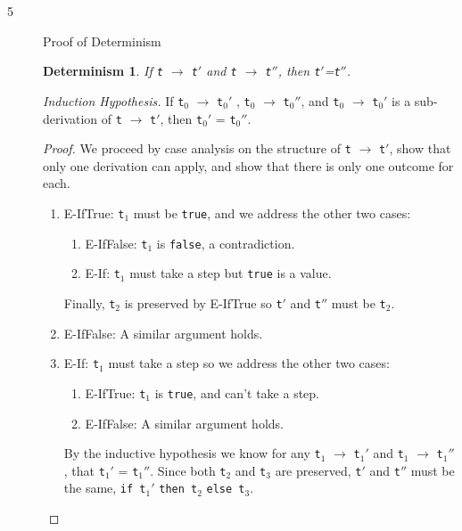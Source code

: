 \documentclass{article}
\newtheorem{deter}{Determinism}
\begin{document}
\begin{description}
\newpage

  \item[5]{Proof of Determinism}
    \begin{deter}If \verb|t| $\longrightarrow$ \verb|t|$'$ and \verb|t| $\longrightarrow$ \verb|t|$''$, then \verb|t|$'$=\verb|t|$''$.
    \end{deter}

    \textit{Induction Hypothesis.} If \verb|t|$_0$ $\longrightarrow$ \verb|t|$_0'$ , \verb|t|$_0$ $\longrightarrow$ \verb|t|$_0''$, and \verb|t|$_0$ $\longrightarrow$ \verb|t|$_0'$ is a sub-derivation of \verb|t| $\longrightarrow$ \verb|t|$'$, then \verb|t|$_0'$ = \verb|t|$_0''$.

    \begin{proof}
      We proceed by case analysis on the structure of \verb|t| $\longrightarrow$ \verb|t|$'$, show that only one derivation can apply, and show that there is only one outcome for each.

      \begin{enumerate}
        \item E-IfTrue: \verb|t|$_1$ must be \verb|true|, and we address the other two cases:
          \begin{enumerate}
            \item E-IfFalse: \verb|t|$_1$ is \verb|false|, a contradiction.
            \item E-If: \verb|t|$_1$ must take a step but \verb|true| is a value.
          \end{enumerate}

          Finally, \verb|t|$_2$ is preserved by E-IfTrue so \verb|t|$'$ and \verb|t|$''$ must be \verb|t|$_2$.

        \item E-IfFalse: A similar argument holds.

        \item E-If: \verb|t|$_1$ must take a step so we address the other two cases:
          \begin{enumerate}
            \item E-IfTrue: \verb|t|$_1$ is \verb|true|, and can't take a step.
            \item E-IfFalse: A similar argument holds.
          \end{enumerate}

          By the inductive hypothesis we know for any \verb|t|$_1$ $\longrightarrow$ \verb|t|$_1'$ and \verb|t|$_1$ $\longrightarrow$ \verb|t|$_1''$, that \verb|t|$_1'$ = \verb|t|$_1''$. Since both \verb|t|$_2$ and \verb|t|$_3$ are preserved, \verb|t|$'$ and \verb|t|$''$ must be the same, \verb|if t|$_1'$ \verb|then t|$_2$ \verb|else t|$_3$.
      \end{enumerate}
    \end{proof}


\end{description}
\end{document}
